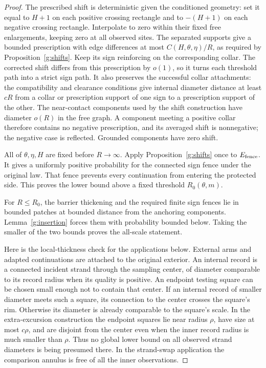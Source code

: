 \begin{proof}
The prescribed shift is deterministic given the conditioned geometry:
set it equal to \(H+1\) on each positive crossing rectangle and to \(-(H+1)\)
on each negative crossing rectangle. Interpolate to zero within their
fixed free enlargements, keeping zero at all observed sites. The separated supports give a bounded
prescription with edge differences at most \(C(H,\theta,\eta)/R\),
as required by Proposition~\ref{g:shifts}. Keep its sign reinforcing
on the corresponding collar. The corrected shift differs from this
prescription by \(o(1)\), so it turns each threshold path into a
strict sign path. It also preserves the successful collar attachments:
the compatibility and clearance conditions give internal diameter
distance at least \(cR\) from a collar or prescription support of
one sign to a prescription support of the other. The near-contact
components used by the shift construction have diameter \(o(R)\)
in the free graph. A component meeting a positive collar therefore
contains no negative prescription, and its averaged
shift is nonnegative; the negative case is reflected. Grounded
components have zero shift.

All of \(\theta,\eta,H\) are fixed before \(R\to\infty\).
Apply Proposition~\ref{g:shifts} once to \(E_{\rm fence}\). It gives a uniformly
positive probability for the connected sign fence under the original
law. That fence prevents every continuation from entering the protected
side. This proves the lower bound above a fixed threshold
\(R_0(\theta,m)\).

For \(R\leq R_0\), the barrier thickening and the required finite sign
fences lie in bounded patches at bounded distance from the anchoring
components. Lemma~\ref{g:insertion} forces them with probability
bounded below. Taking the smaller of the two bounds proves the
all-scale statement.

Here is the local-thickness check for the applications below. External
arms and adapted continuations are attached to the original exterior.
An internal record is a connected incident strand through the sampling
center, of diameter comparable to its record radius when its quality
is positive. An endpoint testing square can be chosen small enough
not to contain that center. If an internal record of smaller diameter
meets such a square, its connection to the center crosses the square's
rim. Otherwise its diameter is already comparable to the square's
scale. In the extra-excursion construction the endpoint squares lie
near radius \(\rho\), have size at most \(c\rho\), and are disjoint
from the center even when the inner record radius is much smaller
than \(\rho\). Thus no global lower bound on all observed strand
diameters is being presumed there. In the strand-swap application
the comparison annulus is free of all the inner observations.
\end{proof}

